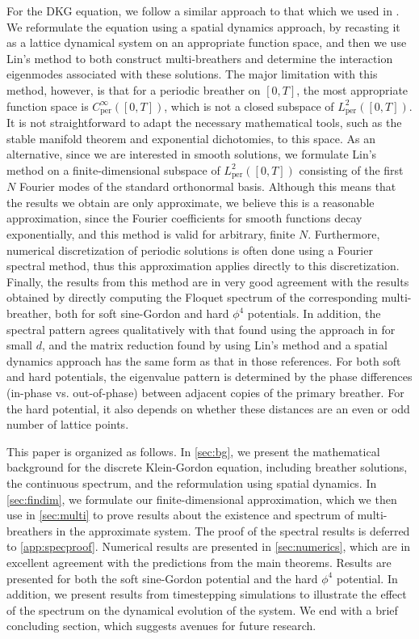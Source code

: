 \documentclass[12pt,reqno]{amsart}
\def\per{\textrm{per}}
\theoremstyle{definition}
\begin{document}
For the DKG equation, we follow a similar approach to that which we used in \cite{Parker2020}. We reformulate the equation using a spatial dynamics approach, by recasting it as a lattice dynamical system on an appropriate function space, and then we use Lin's method to both construct multi-breathers and determine the interaction eigenmodes associated with these solutions. The major limitation with this method, however, is that for a periodic breather on $[0,T]$, the most appropriate function space is $C^\infty_\per([0,T])$, which is not a closed subspace of $L^2_\per([0,T])$. It is not straightforward to adapt the necessary mathematical tools, such as the stable manifold theorem and exponential dichotomies, to this space. As an alternative, since we are interested in smooth solutions, we formulate Lin's method on a finite-dimensional subspace of $L^2_\per([0,T])$ consisting of the first $N$ Fourier modes of the standard orthonormal basis. Although this means that the results we obtain are only approximate, we believe this is a reasonable approximation, since the Fourier coefficients for smooth functions decay exponentially, and this method is valid for arbitrary, finite $N$. Furthermore, numerical discretization of periodic solutions is often done using a Fourier spectral method, thus this approximation applies directly to this discretization. Finally, the results from this method are in very good agreement with the results obtained by directly computing the Floquet spectrum of the corresponding multi-breather, both for soft sine-Gordon and hard $\phi^4$ potentials. In addition, the spectral pattern agrees qualitatively with that found using the approach in \cites{Pelinovsky2012,cuevas-maraver2016} for small $d$, and the matrix reduction found by using Lin's method and a spatial dynamics approach has the same form as that in those references.
For both soft and hard potentials, the eigenvalue pattern is determined by the phase differences (in-phase vs. out-of-phase) between adjacent copies of the primary breather. For the hard potential, it also depends on whether these distances are an even or odd number of lattice points.

This paper is organized as follows. In \cref{sec:bg}, we present the mathematical background for the discrete Klein-Gordon equation, including breather solutions, the continuous spectrum, and the reformulation using spatial dynamics. In \cref{sec:findim}, we formulate our finite-dimensional approximation, which we then use in \cref{sec:multi} to prove results about the existence and spectrum of multi-breathers in the approximate system. The proof of the spectral results is deferred to \cref{app:specproof}. Numerical results are presented in \cref{sec:numerics}, which are in excellent agreement with the predictions from the main theorems. Results are presented for both the soft sine-Gordon potential and the hard $\phi^4$ potential. In addition, we present results from timestepping simulations to illustrate the effect of the spectrum on the dynamical evolution of the system. We end with a brief concluding section, which suggests avenues for future research.
\end{document}
